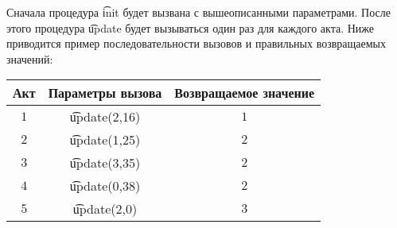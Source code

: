 Сначала процедура \t{init} будет вызвана с вышеописанными параметрами. После этого
процедура \t{update} будет вызываться один раз для каждого акта. Ниже приводится пример
последовательности вызовов и правильных возвращаемых значений:
\begin{center}
\begin{tabular}{ c c c } 
\bf{Акт} & \bf{Параметры вызова} & \bf{Возвращаемое значение} \\
\hline
$1$ & \t{update(2,16)} & $1$ \\
$2$ & \t{update(1,25)} & $2$ \\
$3$ & \t{update(3,35)} & $2$ \\
$4$ & \t{update(0,38)} & $2$ \\
$5$ & \t{update(2,0)} & $3$ \\
\end{tabular}
\end{center}
